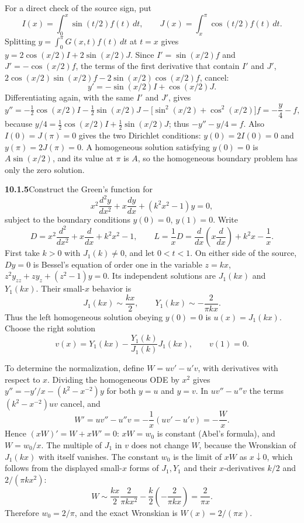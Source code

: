 For a direct check of the source sign, put
\[
I(x)=\int_0^x\sin(t/2)f(t)\,dt,\qquad
J(x)=\int_x^\pi\cos(t/2)f(t)\,dt.
\]
Splitting $y=\int_0^\pi G(x,t)f(t)\,dt$ at $t=x$ gives
$y=2\cos(x/2)I+2\sin(x/2)J$. Since
$I'=\sin(x/2)f$ and $J'=-\cos(x/2)f$, the terms of the first
derivative that contain $I'$ and $J'$,
$2\cos(x/2)\sin(x/2)f-2\sin(x/2)\cos(x/2)f$, cancel:
\[
y'=-\sin(x/2)I+\cos(x/2)J.
\]
Differentiating again, with the same $I'$ and $J'$, gives
\[
y''=-\tfrac12\cos(x/2)I-\tfrac12\sin(x/2)J
-\bigl[\sin^2(x/2)+\cos^2(x/2)\bigr]f=-\frac y4-f,
\]
because $y/4=\frac12\cos(x/2)I+\frac12\sin(x/2)J$; thus $-y''-y/4=f$.
Also $I(0)=J(\pi)=0$ gives the two Dirichlet conditions:
$y(0)=2I(0)=0$ and $y(\pi)=2J(\pi)=0$.
A homogeneous solution satisfying $y(0)=0$ is $A\sin(x/2)$, and its
value at $\pi$ is $A$, so the homogeneous boundary problem has only
the zero solution.

\par\bigskip
\noindent\textbf{10.1.5}\quad Construct the Green's function for
\[
x^{2}\frac{d^{2}y}{dx^{2}}+x\frac{dy}{dx}+(k^{2}x^{2}-1)y=0,
\]
subject to the boundary conditions $y(0)=0$, $y(1)=0$.
\solution
{}
Write
\[
D=x^2\frac{d^2}{dx^2}+x\frac d{dx}+k^2x^2-1,
\qquad
L=\frac1xD=\frac d{dx}\left(x\frac d{dx}\right)+k^2x-\frac1x.
\]
First take $k>0$ with $J_1(k)\ne0$, and let $0<t<1$. On either side of
the source, $Dy=0$ is Bessel's equation of order one in the variable
$z=kx$, $z^2y_{zz}+zy_z+(z^2-1)y=0$. Its independent
solutions are $J_1(kx)$ and $Y_1(kx)$. Their small-$x$ behavior is
\[
J_1(kx)\sim\frac{kx}{2},\qquad
Y_1(kx)\sim-\frac{2}{\pi kx}.
\]
Thus the left homogeneous solution obeying $y(0)=0$ is
$u(x)=J_1(kx)$. Choose the right solution
\[
v(x)=Y_1(kx)-\frac{Y_1(k)}{J_1(k)}J_1(kx),\qquad v(1)=0.
\]

To determine the normalization, define $W=uv'-u'v$, with derivatives
with respect to $x$. Dividing the homogeneous ODE by $x^2$ gives
$y''=-y'/x-(k^2-x^{-2})y$ for both $y=u$ and $y=v$. In $uv''-u''v$
the terms $(k^2-x^{-2})uv$ cancel, and
\[
W'=uv''-u''v=-\frac1x(uv'-u'v)=-\frac Wx.
\]
Hence $(xW)'=W+xW'=0$: $xW=w_0$ is constant (Abel's formula), and
$W=w_0/x$. The multiple of $J_1$ in $v$ does not change $W$, because
the Wronskian of $J_1(kx)$ with itself vanishes. The constant $w_0$ is
the limit of $xW$ as $x\downarrow0$, which follows from the displayed
small-$x$ forms of $J_1,Y_1$ and their $x$-derivatives $k/2$ and
$2/(\pi kx^2)$:
\[
W\sim\frac{kx}{2}\frac{2}{\pi kx^2}
      -\frac k2\left(-\frac{2}{\pi kx}\right)
=\frac{2}{\pi x}.
\]
Therefore $w_0=2/\pi$, and the exact Wronskian is $W(x)=2/(\pi x)$.

